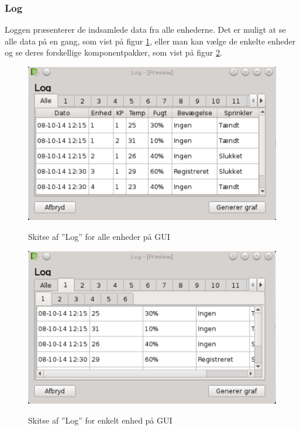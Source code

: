 \subsubsection{Log}
Loggen præsenterer de indsamlede data fra alle enhederne. Det er muligt at se alle data på en gang, som vist på figur \ref{fig:GUI-log-alle}, eller man kan vælge de enkelte enheder og se deres forskellige komponentpakker, som vist på figur \ref{fig:GUI-log-enhed}.

\begin{figure}[htbp] \centering
{\includegraphics[scale=0.5]{filer/pics/GUI/Log-alle}}
\caption{Skitse af ''Log'' for alle enheder på GUI}
\label{fig:GUI-log-alle}
\end{figure}

\begin{figure}[htbp] \centering
{\includegraphics[scale=0.5]{filer/pics/GUI/Log-enhed}}
\caption{Skitse af ''Log'' for enkelt enhed på GUI}
\label{fig:GUI-log-enhed}
\end{figure}



